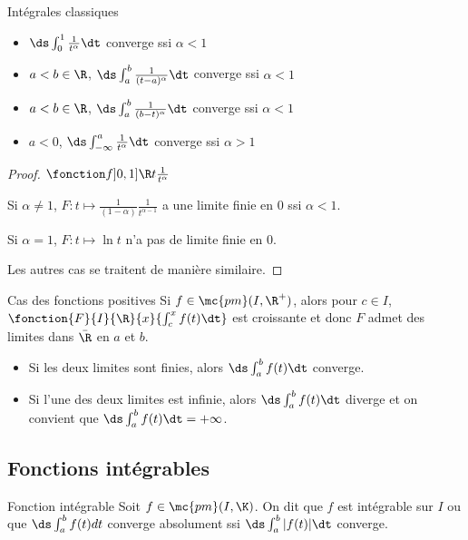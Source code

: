 \begin{theoreme}{Intégrales classiques}{}
    
    \begin{itemize}
        \item $\ds \int_0^1 \frac{1}{t^\alpha} \dt$ converge ssi $\alpha < 1$
        \item $a < b \in \R$, $\ds \int_{a }^{b } \frac 1 {(t - a)^\alpha} \dt$ converge ssi $\alpha < 1$
        \item $a < b \in \R$, $\ds \int_{a }^{b } \frac 1 {(b - t)^\alpha} \dt$ converge ssi $\alpha < 1$
        \item $a < 0$, $\ds \int_{- \infty}^a \frac 1 {t^\alpha} \dt$ converge ssi $\alpha > 1$
    \end{itemize}
\end{theoreme}

\begin{proof}
    $\fonction f {]0, 1]}{\R}{t}{\frac{1}{t^\alpha}}$ 

    Si $\alpha \neq 1$, $F : t \mapsto \frac 1 {(1 - \alpha)} \frac{1}{t^{\alpha - 1}}$ a 
    une limite finie en $0$ ssi $\alpha < 1$. 

    Si $\alpha = 1$, $F : t \mapsto \ln t$ n'a pas de limite finie en $0$.

    Les autres cas se traitent de manière similaire. 
\end{proof}


\begin{proposition}{Cas des fonctions positives}{}
    Si $f \in \mc{pm}(I, \R^+)$, alors pour $c \in I$, $\fonction{F}{I}{\R}{x}{\int_c^x f(t) \dt}$ est croissante
    et donc $F$ admet des limites dans $\bar{\R}$ en $a$ et $b$.

    \begin{itemize}
        \item Si les deux limites sont finies, alors $\ds \int_a^b f(t) \dt$ converge.
        \item Si l'une des deux limites est infinie, alors $\ds \int_a^b f(t) \dt$ diverge et on convient 
        que $\ds \int_a^b f(t) \dt = + \infty$.
    \end{itemize}
\end{proposition}


\subsection{Fonctions intégrables }

\begin{definition}{Fonction intégrable}{}
    Soit $f \in \mc{pm}(I, \K)$. On dit que $f$ est intégrable sur $I$ ou que 
    $\ds \int_a^b f(t) dt$ converge absolument ssi $\ds \int_a^b |f(t)| \dt$ converge.
\end{definition}

